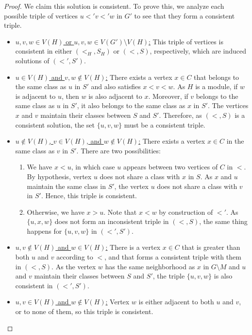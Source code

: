 \documentclass[11pt]{article}
\theoremstyle{plain}
\theoremstyle{definition}
\theoremstyle{remark}
\begin{document}
\begin{appendices}
\begin{proof}
    We claim this solution is consistent. To prove this, we analyze each possible triple of vertices $u <' v <' w$ in $G'$ to see that they form a consistent triple.
    \begin{itemize}
        \item \underline{$u, v, w \in V(H)$ or $u, v, w \in V(G') \setminus V(H)$:} This triple of vertices is consistent in either $(<_H,S_H)$ or $(<, S)$, respectively, which are induced solutions of $(<', S')$.
        \item \underline{$u \in V(H)$ and $v, w \not\in V(H)$:} There exists a vertex $x \in C$ that belongs to the same class as $u$ in $S'$ and also satisfies $x < v < w$. As $H$ is a module, if $w$ is adjacent to $u$, then $w$ is also adjacent to $x$. Moreover, if $v$ belongs to the same class as $u$ in $S'$, it also belongs to the same class as $x$ in $S'$. The vertices $x$ and $v$ maintain their classes between $S$ and $S'$. Therefore, as $(<, S)$ is a consistent solution, the set $\{u,v,w\}$ must be a consistent triple.
        \item \underline{$u \not\in V(H)$, $v \in V(H)$, and $w \not\in V(H)$:} There exists a vertex $x \in C$ in the same class as $v$ in $S'$. There are two possibilities:
        \begin{enumerate}
            \item We have $x < u$, in which case $u$ appears between two vertices of $C$ in $<$. By hypothesis, vertex $u$ does not share a class with $x$ in $S$. As $x$ and $u$ maintain the same class in $S'$, the vertex $u$ does not share a class with $v$ in $S'$. Hence, this triple is consistent.
            \item Otherwise, we have $x > u$. Note that $x < w$ by construction of $<'$. As $\{u, x, w\}$ does not form an inconsistent triple in $(<, S)$, the same thing happens for $\{u, v, w\}$ in $(<', S')$.
        \end{enumerate}
        \item \underline{$u, v \not\in V(H)$ and $w \in V(H)$:} There is a vertex $x \in C$ that is greater than both $u$ and $v$ according to $<$, and that forms a consistent triple with them in $(<, S)$. As the vertex $w$ has the same neighborhood as $x$ in $G \setminus M$ and $u$ and $v$ maintain their classes between $S$ and $S'$, the triple $\{u, v, w\}$ is also consistent in $(<', S')$.
        \item \underline{$u,v \in V(H)$ and $w \not\in V(H)$:} Vertex $w$ is either adjacent to both $u$ and $v$, or to none of them, so this triple is consistent.

\end{itemize}
\end{proof}
\end{appendices}
\end{document}
